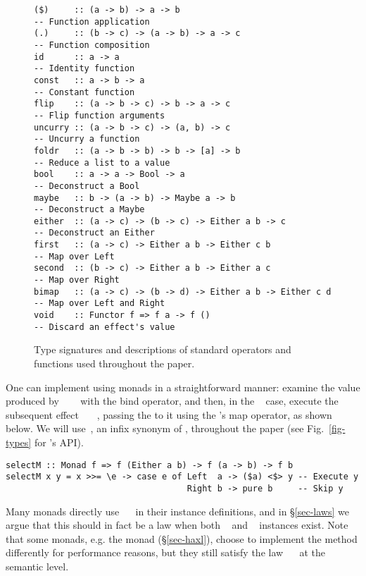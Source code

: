 \begin{figure}
\begin{verbatim}
($)     :: (a -> b) -> a -> b                               -- Function application
(.)     :: (b -> c) -> (a -> b) -> a -> c                   -- Function composition
id      :: a -> a                                           -- Identity function
const   :: a -> b -> a                                      -- Constant function
flip    :: (a -> b -> c) -> b -> a -> c                     -- Flip function arguments
uncurry :: (a -> b -> c) -> (a, b) -> c                     -- Uncurry a function
foldr   :: (a -> b -> b) -> b -> [a] -> b                   -- Reduce a list to a value
bool    :: a -> a -> Bool -> a                              -- Deconstruct a Bool
maybe   :: b -> (a -> b) -> Maybe a -> b                    -- Deconstruct a Maybe
either  :: (a -> c) -> (b -> c) -> Either a b -> c          -- Deconstruct an Either
first   :: (a -> c) -> Either a b -> Either c b             -- Map over Left
second  :: (b -> c) -> Either a b -> Either a c             -- Map over Right
bimap   :: (a -> c) -> (b -> d) -> Either a b -> Either c d -- Map over Left and Right
void    :: Functor f => f a -> f ()                         -- Discard an effect's value
\end{verbatim}
\caption{Type signatures and descriptions of standard operators and functions
used throughout the paper.}\label{fig-std}
\end{figure}

One can implement  using monads in a straightforward manner: examine
the value produced by ~~~ with the bind operator,
and then, in the ~ case, execute the subsequent effect
~~\hs{->}~, passing the  to it using the
's map operator, as shown below. We will use~, an
infix synonym of , throughout the paper (see Fig.~\ref{fig-types} for
's API).

\vspace{1mm}
\begin{verbatim}
selectM :: Monad f => f (Either a b) -> f (a -> b) -> f b
selectM x y = x >>= \e -> case e of Left  a -> ($a) <$> y -- Execute y
                                    Right b -> pure b     -- Skip y
\end{verbatim}
\vspace{1mm}

\noindent
Many monads directly use ~\hs{=}~ in their 
instance definitions, and in \S\ref{sec-laws} we argue that this should in fact
be a law when both ~ and ~ instances exist.
Note that some monads, e.g. the \Haxl monad (\S\ref{sec-haxl}), choose to
implement the   method differently for performance reasons, but they
still satisfy the law ~\hs{=}~ at the semantic level.

